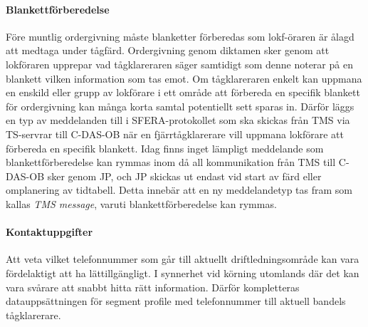\paragraph{Blankettförberedelse}
Före muntlig ordergivning måste blanketter förberedas som lokf-öraren är ålagd att medtaga under tågfärd.
Ordergivning genom diktamen sker genom att lokföraren upprepar vad tågklareraren säger samtidigt som denne noterar på en blankett vilken information som tas emot.
Om tågklareraren enkelt kan uppmana en enskild eller grupp av lokförare i ett område att förbereda en specifik blankett för ordergivning kan många korta samtal potentiellt sett sparas in.
Därför läggs en typ av meddelanden till i SFERA-protokollet som ska skickas från TMS via TS-servrar till C-DAS-OB när en fjärrtågklarerare vill uppmana lokförare att förbereda en specifik blankett.
Idag finns inget lämpligt meddelande som blankettförberedelse kan rymmas inom då all kommunikation från TMS till C-DAS-OB sker genom JP\@, och JP skickas ut endast vid start av färd eller omplanering av tidtabell.
Detta innebär att en ny meddelandetyp tas fram som kallas \emph{TMS message}, varuti blankettförberedelse kan rymmas.
\paragraph{Kontaktuppgifter}
Att veta vilket telefonnummer som går till aktuellt driftledningsområde kan vara fördelaktigt att ha lättillgängligt.
I synnerhet vid körning utomlands där det kan vara svårare att snabbt hitta rätt information.
Därför kompletteras datauppsättningen för segment profile med telefonnummer till aktuell bandels tågklarerare.
